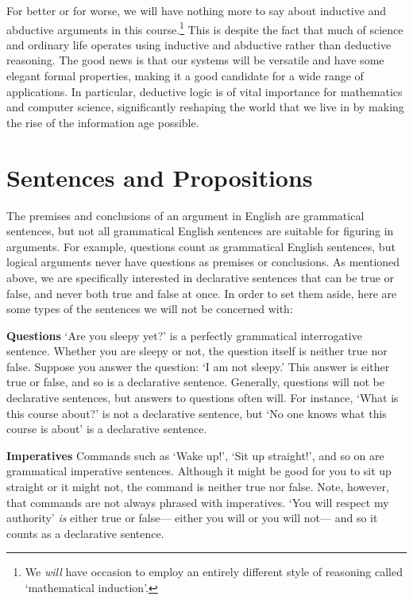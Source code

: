 For better or for worse, we will have nothing more to say about inductive and abductive arguments in this course.\footnote{We \textit{will} have occasion to employ an entirely different style of reasoning called `mathematical induction'.}
This is despite the fact that much of science and ordinary life operates using inductive and abductive rather than deductive reasoning.
The good news is that our systems will be versatile and have some elegant formal properties, making it a good candidate for a wide range of applications.
In particular, deductive logic is of vital importance for mathematics and computer science, significantly reshaping the world that we live in by making the rise of the information age possible.






\section{Sentences and Propositions}
\label{intro.sentences}

The premises and conclusions of an argument in English are grammatical sentences, but not all grammatical English sentences are suitable for figuring in arguments.
For example, questions count as grammatical English sentences, but logical arguments never have questions as premises or conclusions.
As mentioned above, we are specifically interested in declarative sentences that can be true or false, and never both true and false at once.
In order to set them aside, here are some types of the sentences we will not be concerned with:

\textbf{Questions} `Are you sleepy yet?' is a perfectly grammatical interrogative sentence.
Whether you are sleepy or not, the question itself is neither true nor false.
Suppose you answer the question: `I am not sleepy.'
This answer is either true or false, and so is a declarative sentence.
Generally, questions will not be declarative sentences, but answers to questions often will. 
For instance, `What is this course about?' is not a declarative sentence, but `No one knows what this course is about' is a declarative sentence.

\textbf{Imperatives} Commands such as `Wake up!', `Sit up straight!', and so on are grammatical imperative sentences.
Although it might be good for you to sit up straight or it might not, the command is neither true nor false.
Note, however, that commands are not always phrased with imperatives.
`You will respect my authority' \emph{is} either true or false--- either you will or you will not--- and so it counts as a declarative sentence.


